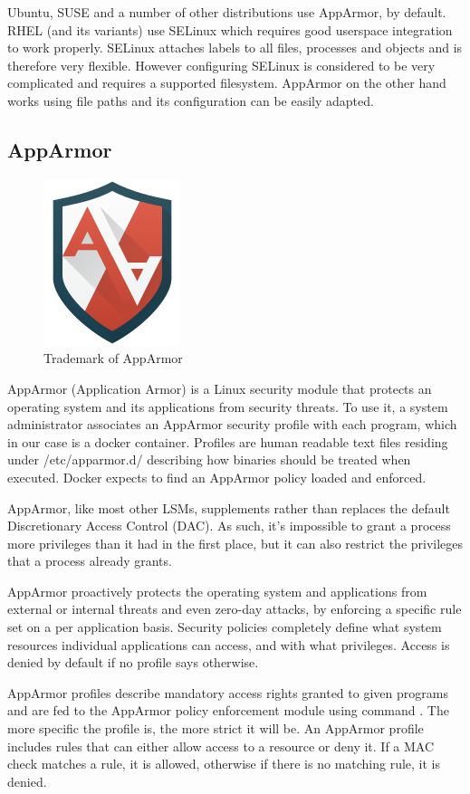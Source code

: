 Ubuntu, SUSE and a number of other distributions use AppArmor, by default. RHEL (and its variants) use SELinux which requires good userspace integration to work properly. SELinux attaches labels to all files, processes and objects and is therefore very flexible. However configuring SELinux is considered to be very complicated and requires a supported filesystem. AppArmor on the other hand works using file paths and its configuration can be easily adapted. \cite{archlsm}

\subsection{AppArmor}
\begin{figure}[h!]
  \centering
   \includegraphics[width=0.17\linewidth]{./figures/AppArmor.png}
   \caption{Trademark of AppArmor}
\end{figure}

AppArmor (Application Armor) is a Linux security module that protects an operating system and its applications from security threats. To use it, a system administrator associates an AppArmor security profile with each program, which in our case is a docker container. Profiles are human readable text files residing under /etc/apparmor.d/ describing how binaries should be treated when executed. Docker expects to find an AppArmor policy loaded and enforced.

AppArmor, like most other LSMs, supplements rather than replaces the default Discretionary Access Control (DAC). As such, it's impossible to grant a process more privileges than it had in the first place, but it can also restrict the privileges that a process already grants.

AppArmor proactively protects the operating system and applications from external or internal threats and even zero-day attacks, by enforcing a specific rule set on a per application basis. Security policies completely define what system resources individual applications can access, and with what privileges. Access is denied by default if no profile says otherwise. \cite{archlsm}

AppArmor profiles describe mandatory access rights granted to given programs and are fed to the AppArmor policy enforcement module using command . The more specific the profile is, the more strict it will be. An AppArmor profile includes rules that can either allow access to a resource or deny it. If a MAC check matches a rule, it is allowed, otherwise if there is no matching rule, it is denied.

